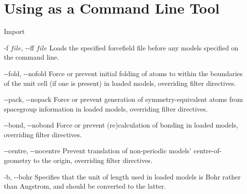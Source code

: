 \chapter{Using as a Command Line Tool}
\label{sec:cli}


\begin{optlist}{Import}

	\item[-f $file$, {-}{-}ff $file$]
		Loads the specified forcefield file before any models specified on the command line.

	\item[{-}{-}fold, {-}{-}nofold\its]
		Force or prevent initial folding of atoms to within the boundaries of the unit cell (if one is present) in loaded models, overriding filter directives.
	
	\item[{-}{-}pack, {-}{-}nopack\its]
		Force or prevent generation of symmetry-equivalent atoms from spacegroup information in loaded models, overriding filter directives.
	
	\item[{-}{-}bond, {-}{-}nobond\its]
		Force or prevent (re)calculation of bonding in loaded models, overriding filter directives.
	
	\item[{-}{-}centre, {-}{-}nocentre\its]
		Prevent translation of non-periodic models’ centre-of-geometry to the origin, overriding filter directives.
	
	\item[-b, {-}{-}bohr\its]
		Specifies that the unit of length used in loaded models is Bohr rather than Angstrom, and should be converted to the latter.

\end{optlist}


